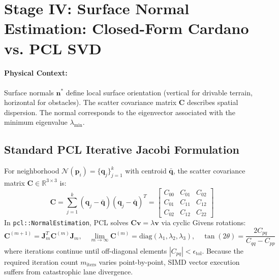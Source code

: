 \documentclass[11pt,a4paper]{article}
\begin{document}
\section{Stage IV: Surface Normal Estimation: Closed-Form Cardano vs. PCL SVD}
\label{sec:cardano_math}

\paragraph{Physical Context:} Surface normals $\bm{n}^*$ define local surface orientation (vertical for drivable terrain, horizontal for obstacles). The scatter covariance matrix $\mathbf{C}$ describes spatial dispersion. The normal corresponds to the eigenvector associated with the minimum eigenvalue $\lambda_{\min}$.

\subsection{Standard PCL Iterative Jacobi Formulation}
For neighborhood $\mathcal{N}(\bm{p}_i) = \{\bm{q}_j\}_{j=1}^k$ with centroid $\bar{\bm{q}}$, the scatter covariance matrix $\mathbf{C} \in \mathbb{R}^{3 \times 3}$ is:
\begin{equation}
\mathbf{C} = \sum_{j=1}^k (\bm{q}_j - \bar{\bm{q}})(\bm{q}_j - \bar{\bm{q}})^T = \begin{bmatrix}
C_{00} & C_{01} & C_{02} \\
C_{01} & C_{11} & C_{12} \\
C_{02} & C_{12} & C_{22}
\end{bmatrix}
\end{equation}
In \texttt{pcl::NormalEstimation}, PCL solves $\mathbf{C}\bm{v} = \lambda\bm{v}$ via cyclic Givens rotations:
\begin{equation}
\mathbf{C}^{(m+1)} = \mathbf{J}_m^T \mathbf{C}^{(m)} \mathbf{J}_m, \quad \lim_{m \to \infty} \mathbf{C}^{(m)} = \text{diag}(\lambda_1, \lambda_2, \lambda_3), \quad \tan(2\theta) = \frac{2 C_{pq}}{C_{qq} - C_{pp}}
\label{eq:pcl_jacobi_math}
\end{equation}
where iterations continue until off-diagonal elements $|C_{pq}| < \epsilon_{\text{tol}}$. Because the required iteration count $m_{\text{iters}}$ varies point-by-point, SIMD vector execution suffers from catastrophic lane divergence.
\end{document}
